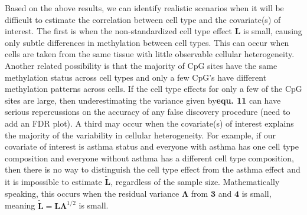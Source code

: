 \documentclass{article}
\begin{document}
\indent Based on the above results, we can identify realistic scenarios when it will be difficult to estimate the correlation between cell type and the covariate(s) of interest. The first is when the non-standardized cell type effect $\bm{L}$ is small, causing only subtle differences in methylation between cell types. This can occur when cells are taken from the same tissue with little observable cellular heterogeneity. Another related possibility is that the majority of CpG sites have the same methylation status across cell types and only a few CpG's have different methylation patterns across cells. If the cell type effects for only a few of the CpG sites are large, then underestimating the variance given by\textbf{equ. 11} can have serious repercussions on the accuracy of any false discovery procedure (need to add an FDR plot). A third may occur when the covariate(s) of interest explains the majority of the variability in cellular heterogeneity. For example, if our covariate of interest is asthma status and everyone with asthma has one cell type composition and everyone without asthma has a different cell type composition, then there is no way to distinguish the cell type effect from the asthma effect and it is impossible to estimate $\tilde{\bm{L}}$, regardless of the sample size. Mathematically speaking, this occurs when the residual variance $\bm{\Lambda}$ from $\bm{3}$ and $\bm{4}$ is small, meaning $\bm{\tilde{L}} = \bm{L}\bm{\Lambda}^{1/2}$ is small.
\end{document}
